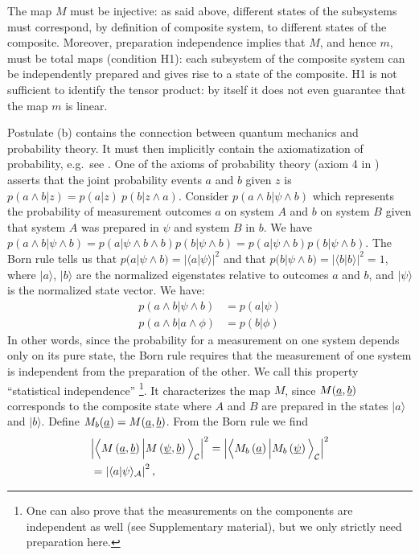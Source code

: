 \documentclass[aps,prl,amsmath,amssymb,twocolumn]{revtex4}
\theoremstyle{plain}
\theoremstyle{definition}
\theoremstyle{remark}
\newcommand{\pj}[1] {\underbar{$#1$}}
\def\>{\rangle}
\def\<{\langle}
\def\labell#1{\label{#1}}
\begin{document}
	The map $M$ must be injective: as said above, different states of the
	subsystems must correspond, by definition of composite system, to
	different states of the composite. Moreover, preparation independence
	implies that $M$, and hence $m$, must be total maps (condition H1):
	each subsystem of the composite system can be independently prepared
	and gives rise to a state of the composite.  H1 is not sufficient to
	identify the tensor product: by itself it does not even guarantee that
	the map $m$ is linear.
	
	Postulate (b) contains the connection between quantum mechanics and
	probability theory. It must then implicitly contain the axiomatization
	of probability, e.g.~see \cite{ballentinepaper,ballentinebook,cox}.
	One of the axioms of probability theory (axiom 4 in
	\cite{ballentinepaper}) asserts that the joint probability events $a$
	and $b$ given $z$ is $p(a\wedge b|z)=p(a|z)\:p(b|z\wedge a)$.
	Consider $p(a \wedge b | \psi \wedge b)$ which represents the
	probability of measurement outcomes $a$ on system $A$ and $b$ on
	system $B$ given that system $A$ was prepared in $\psi$ and system $B$
	in $b$.  We have
	$p(a \wedge b | \psi \wedge b) = p(a | \psi \wedge b \wedge b) p(b |
	\psi \wedge b) = p(a | \psi \wedge b ) p(b | \psi \wedge b)$. The Born
	rule tells us that $p(a | \psi \wedge b) = |\<a|\psi\>|^2$ and that
	$p(b | \psi \wedge b) = |\<b|b\>|^2 = 1$, where $|a\>$, $|b\>$ are the
	normalized eigenstates relative to outcomes $a$ and $b$, and $|\psi\>$
	is the normalized state vector. We have:
	\begin{align}
	p(a\wedge b|\psi \wedge b)&=p(a|\psi)\\
	p(a\wedge b|a \wedge \phi)&=p(b|\phi)
	\end{align}
	In other words, since the probability for a measurement on one system
	depends only on its pure state, the Born rule requires that the
	measurement of one system is independent from the preparation of the
	other. We call this property ``statistical
	independence'' \footnote{One can also prove that the measurements on
		the components are independent as well (see Supplementary material),
		but we only strictly need preparation here.}.  It characterizes the
	map $M$, since $M(\pj{a}, \pj{b})$ corresponds to the composite state
	where $A$ and $B$ are prepared in the states $|a\>$ and $|b\>$.
	Define $M_b(\pj{a}) = M(\pj{a},\pj{b})$. From the Born rule we find
	\begin{align} &\Big|\Big\<M\left(\pj{a},\pj{b}\right)\Big|M\left(\pj{\psi},\pj{b}\right)\Big\>_{\cal C}\Big|^2
	=\Big|\Big\<M_b\left(\pj{a}\right)\Big|M_b\left(\pj{\psi}\right)\Big\>_{\cal C}\Big|^2
	\nonumber \\&
	=\left|\<a|\psi\>_{\cal A}\right|^2
	\labell{questa},
	\end{align}
\end{document}
